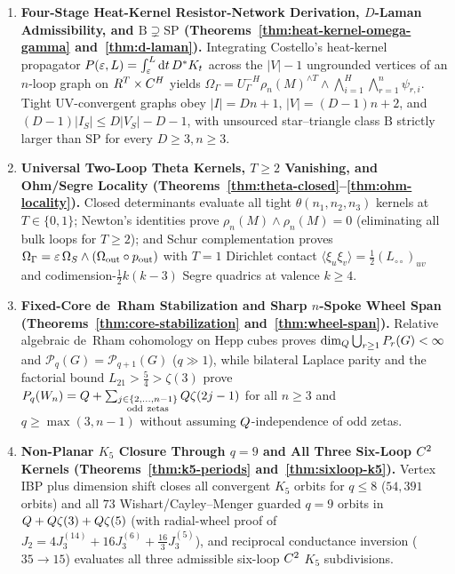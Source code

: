 \begin{enumerate}[label=\textbf{Result~\arabic*.},leftmargin=*]
  \item \textbf{Four-Stage Heat-Kernel Resistor-Network Derivation, $D$-Laman Admissibility, and $\mathrm{B}\supsetneq\mathrm{SP}$ (Theorems~\ref{thm:heat-kernel-omega-gamma} and~\ref{thm:d-laman}).} Integrating Costello's heat-kernel propagator $P(\varepsilon,L) = \int_\varepsilon^L\mathrm{d} t\,D^* K_t$ across the $|V|-1$ ungrounded vertices of an $n$-loop graph on $R^T\times C^H$ yields $\Omega_\Gamma = U_\Gamma^{-H}\rho_n(M)^{\wedge T}\wedge\bigwedge_{i=1}^H\bigwedge_{r=1}^n\psi_{r,i}$. Tight UV-convergent graphs obey $|I| = Dn+1$, $|V| = (D-1)n+2$, and $(D-1)|I_S| \le D|V_S|-D-1$, with unsourced star--triangle class $\mathrm{B}$ strictly larger than $\mathrm{SP}$ for every $D \ge 3, n \ge 3$.

  \item \textbf{Universal Two-Loop Theta Kernels, $T\ge 2$ Vanishing, and Ohm/Segre Locality (Theorems~\ref{thm:theta-closed}--\ref{thm:ohm-locality}).} Closed determinants evaluate all tight $\theta(n_1,n_2,n_3)$ kernels at $T\in\{0,1\}$; Newton's identities prove $\rho_n(M)\wedge\rho_n(M) = 0$ (eliminating all bulk loops for $T \ge 2$); and Schur complementation proves $\Omega_\Gamma = \varepsilon\,\Omega_S\wedge(\Omega_{\mathrm{out}}\circ p_{\mathrm{out}})$ with $T=1$ Dirichlet contact $\langle\xi_u\xi_v\rangle = \frac{1}{2}(L_{\circ\circ})_{uv}$ and codimension-$\frac{1}{2}k(k-3)$ Segre quadrics at valence $k \ge 4$.

  \item \textbf{Fixed-Core de~Rham Stabilization and Sharp $n$-Spoke Wheel Span (Theorems~\ref{thm:core-stabilization} and~\ref{thm:wheel-span}).} Relative algebraic de~Rham cohomology on Hepp cubes proves $\dim_{Q}\bigcup_{r\ge 1}P_r(G) < \infty$ and $\mathcal{P}_q(G) = \mathcal{P}_{q+1}(G)$ ($q\gg 1$), while bilateral Laplace parity and the factorial bound $L_{21} > \frac{5}{4} > \zeta(3)$ prove $\mathcal{P}_q(W_n) = \QQ + \sum_{\substack{j\in\{2,\dots,n-1\}\\\mathrm{odd\ zetas}}}\QQ\zeta(2j-1)$ for all $n \ge 3$ and $q \ge \max(3,n-1)$ without assuming $Q$-independence of odd zetas.

  \item \textbf{Non-Planar $K_5$ Closure Through $q=9$ and All Three Six-Loop $C^2$ Kernels (Theorems~\ref{thm:k5-periods} and~\ref{thm:sixloop-k5}).} Vertex IBP plus dimension shift closes all convergent $K_5$ orbits for $q \le 8$ ($54{,}391$ orbits) and all $73$ Wishart/Cayley--Menger guarded $q=9$ orbits in $Q + Q\zeta(3) + Q\zeta(5)$ (with radial-wheel proof of $J_2 = 4J_3^{(14)}+16J_3^{(6)}+\frac{16}{3}J_3^{(5)}$), and reciprocal conductance inversion ($35 \to 15$) evaluates all three admissible six-loop $C^2$ $K_5$ subdivisions.


\end{enumerate}
